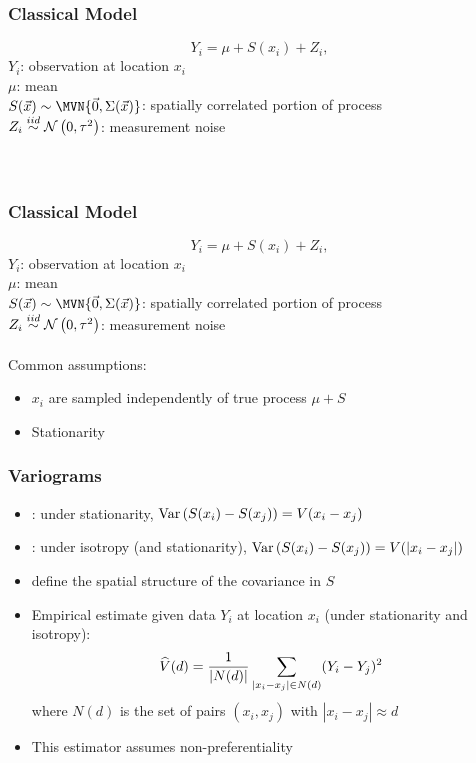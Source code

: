 \documentclass[xcolor=svgnames]{beamer}
\begin{document}
\begin{frame}
\frametitle{Classical Model}

$$ Y_i = \mu + S(x_i) + Z_i, $$
$Y_i$: observation at location $x_i$\\
$\mu$: mean\\
$S(\v{x}) \sim \MVN{\v{0}, \Sigma(\v{x})}$: spatially correlated portion of process\\
$Z_i \stackrel{iid}{\sim} \mathcal{N} \left( 0, \tau^2 \right)$: measurement noise\\
\\~\\
\end{frame}
\begin{frame}
\frametitle{Classical Model}

$$ Y_i = \mu + S(x_i) + Z_i, $$
$Y_i$: observation at location $x_i$\\
$\mu$: mean\\
$S(\v{x}) \sim \MVN{\v{0}, \Sigma(\v{x})}$: spatially correlated portion of process\\
$Z_i \stackrel{iid}{\sim} \mathcal{N} \left( 0, \tau^2 \right)$: measurement noise
\\~\\
Common assumptions:
\begin{itemize}
\item $x_i$ are sampled independently of true process $\mu + S$
\item Stationarity
\end{itemize}

\end{frame}
\begin{frame}
\frametitle{Variograms}

\begin{itemize}
\setlength\itemsep{.05in}
\item {}: under stationarity, $\text{Var}\left(S(x_i) - S(x_j)\right) = V(x_i - x_j)$
\item {}: under isotropy (and stationarity), $\text{Var}\left(S(x_i) - S(x_j)\right) = V(|x_i - x_j|)$
\item {} define the spatial structure of the covariance in $S$
\item Empirical estimate given data $Y_i$ at location $x_i$ (under stationarity and isotropy):
$$ \widehat{V}(d) = \frac{1}{| N(d)|} \sum_{|x_i - x_j| \in N(d)} (Y_i - Y_j)^2 $$
where $N(d)$ is the set of pairs $(x_i,x_j)$ with $|x_i - x_j| \approx d$
\item This estimator assumes non-preferentiality
\end{itemize}

\end{frame}
\end{document}

